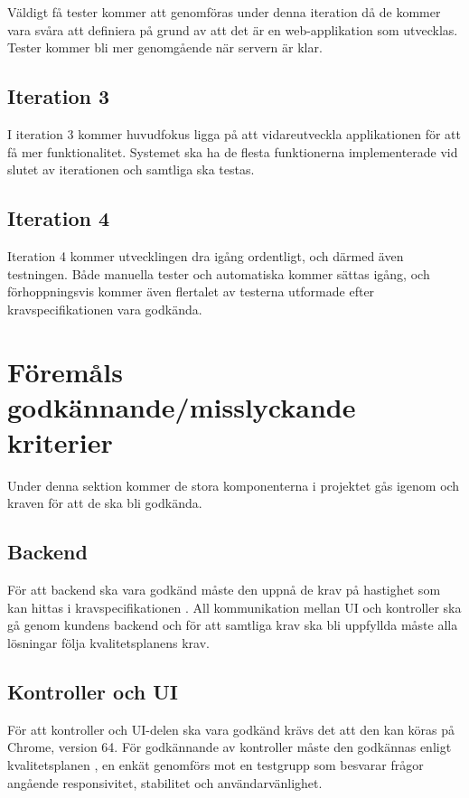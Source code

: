 	Väldigt få tester kommer att genomföras under denna iteration då de kommer vara svåra att definiera på grund av att det är en web-applikation som utvecklas. Tester kommer bli mer genomgående när servern är klar.

\subsection{Iteration 3}
	I iteration 3 kommer huvudfokus ligga på att vidareutveckla applikationen för att få mer funktionalitet. Systemet ska ha de flesta funktionerna implementerade vid slutet av iterationen och samtliga ska testas.
\subsection{Iteration 4}
	Iteration 4 kommer utvecklingen dra igång ordentligt, och därmed även testningen. Både manuella tester och automatiska kommer sättas igång, och förhoppningsvis kommer även flertalet av testerna utformade efter kravspecifikationen vara godkända. 




\section{Föremåls godkännande/misslyckande kriterier}
	Under denna sektion kommer de stora komponenterna i projektet gås igenom och kraven för att de ska bli godkända.

	\subsection{Backend}
		För att backend ska vara godkänd måste den uppnå de krav på hastighet som kan hittas i kravspecifikationen \cite{bib-kravspec}. All kommunikation mellan UI och kontroller ska gå genom kundens backend och för att samtliga krav ska bli uppfyllda måste alla lösningar följa kvalitetsplanens  \cite{bib-kvalitetsplan} krav.

	\subsection{Kontroller och UI}
		För att kontroller och UI-delen ska vara godkänd krävs det att den kan köras på Chrome, version 64. För godkännande av kontroller måste den godkännas enligt kvalitetsplanen \cite{bib-kvalitetsplan}, en enkät genomförs mot en testgrupp som besvarar frågor angående responsivitet, stabilitet och användarvänlighet.



